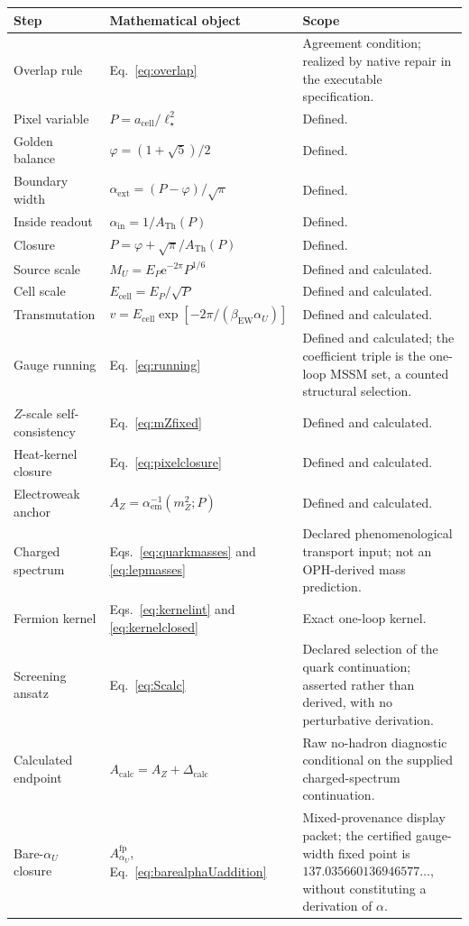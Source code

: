 \documentclass[11pt]{article}
\theoremstyle{remark}
\newcommand{\e}{\mathrm e}
\newcommand{\ATh}{A_{\mathrm{Th}}}
\newcommand{\AZ}{A_Z}
\newcommand{\Dcalc}{\Delta_{\mathrm{calc}}}
\begin{document}
\begin{longtable}{@{}L{0.18\textwidth}L{0.44\textwidth}L{0.28\textwidth}@{}}
\toprule
Step & Mathematical object & Scope \\
\midrule
\endhead
Overlap rule & Eq.~\eqref{eq:overlap} & Agreement condition; realized by native repair in the executable specification. \\
Pixel variable & \(P=a_{\mathrm{cell}}/\ell_\star^2\) & Defined. \\
Golden balance & \(\varphi=(1+\sqrt5)/2\) & Defined. \\
Boundary width & \(\alpha_{\mathrm{ext}}=(P-\varphi)/\sqrt\pi\) & Defined. \\
Inside readout & \(\alpha_{\mathrm{in}}=1/\ATh(P)\) & Defined. \\
Closure & \(P=\varphi+\sqrt\pi/\ATh(P)\) & Defined. \\
Source scale & \(M_U=E_P\e^{-2\pi}P^{1/6}\) & Defined and calculated. \\
Cell scale & \(E_{\mathrm{cell}}=E_P/\sqrt P\) & Defined and calculated. \\
Transmutation & \(v=E_{\mathrm{cell}}\exp[-2\pi/(\beta_{\mathrm{EW}}\alpha_U)]\) & Defined and calculated. \\
Gauge running & Eq.~\eqref{eq:running} & Defined and calculated; the coefficient triple is the one-loop MSSM set, a counted structural selection. \\
\(Z\)-scale self-consistency & Eq.~\eqref{eq:mZfixed} & Defined and calculated. \\
Heat-kernel closure & Eq.~\eqref{eq:pixelclosure} & Defined and calculated. \\
Electroweak anchor & \(\AZ=\alpha_{\mathrm{em}}^{-1}(m_Z^2;P)\) & Defined and calculated. \\
Charged spectrum & Eqs.~\eqref{eq:quarkmasses} and \eqref{eq:lepmasses} & Declared phenomenological transport input; not an OPH-derived mass prediction. \\
Fermion kernel & Eqs.~\eqref{eq:kernelint} and \eqref{eq:kernelclosed} & Exact one-loop kernel. \\
Screening ansatz & Eq.~\eqref{eq:Scalc} & Declared selection of the quark continuation; asserted rather than derived, with no perturbative derivation. \\
Calculated endpoint & \(A_{\mathrm{calc}}=\AZ+\Dcalc\) & Raw no-hadron diagnostic conditional on the supplied charged-spectrum continuation. \\
Bare-\(\alpha_U\) closure & \(A_{\alpha_U}^{\mathrm{fp}}\), Eq.~\eqref{eq:barealphaUaddition} & Mixed-provenance display packet; the certified gauge-width fixed point is \(137.035660136946577\ldots\), without constituting a derivation of \(\alpha\). \\

\end{longtable}
\end{document}
